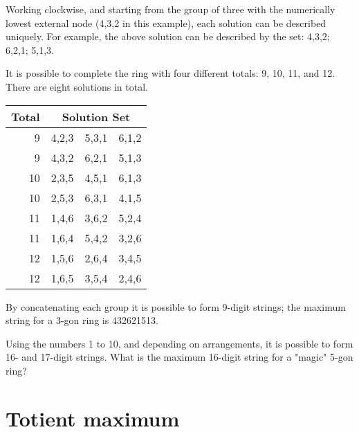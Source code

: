 Working clockwise, and starting from the group of three with the numerically lowest external node (4,3,2 in this example), each solution can be described uniquely. For example, the above solution can be described by the set: 4,3,2; 6,2,1; 5,1,3.

It is possible to complete the ring with four different totals: 9, 10, 11, and 12. There are eight solutions in total.

\begin{center}
    \begin{tabular}{|r|ccc|}
        \hline
        Total & \multicolumn{3}{c|}{Solution Set}\\
        \hline
        9 & 4,2,3 & 5,3,1 & 6,1,2\\
        \hline
        9 & 4,3,2 & 6,2,1 & 5,1,3\\
        \hline
        10 & 2,3,5 & 4,5,1 & 6,1,3\\
        \hline
        10 & 2,5,3 & 6,3,1 & 4,1,5\\
        \hline
        11 & 1,4,6 & 3,6,2 & 5,2,4\\
        \hline
        11 & 1,6,4 & 5,4,2 & 3,2,6\\
        \hline
        12 & 1,5,6 & 2,6,4 & 3,4,5\\
        \hline
        12 & 1,6,5 & 3,5,4 & 2,4,6\\
        \hline
    \end{tabular}
\end{center}

By concatenating each group it is possible to form 9-digit strings; the maximum string for a 3-gon ring is 432621513.

Using the numbers 1 to 10, and depending on arrangements, it is possible to form 16- and 17-digit strings. What is the maximum 16-digit string for a "magic" 5-gon ring?



\section{Totient maximum} \label{pb.069}

